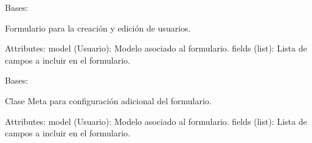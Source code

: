 \documentclass[letterpaper,10pt,spanish]{sphinxmanual}
\begin{document}
\begin{fulllineitems}
\label{\detokenize{modules/appusuarios:appusuarios.forms.UsuarioForm}}
\pysigstartsignatures
{}
\pysigstopsignatures
\sphinxAtStartPar
Bases: 

\sphinxAtStartPar
Formulario para la creación y edición de usuarios.

\sphinxAtStartPar
Attributes:
\sphinxhyphen{} model (Usuario): Modelo asociado al formulario.
\sphinxhyphen{} fields (list): Lista de campos a incluir en el formulario.

\begin{fulllineitems}
\label{\detokenize{modules/appusuarios:appusuarios.forms.UsuarioForm.Meta}}
\pysigstartsignatures
{}
\pysigstopsignatures
\sphinxAtStartPar
Bases: 

\sphinxAtStartPar
Clase Meta para configuración adicional del formulario.

\sphinxAtStartPar
Attributes:
\sphinxhyphen{} model (Usuario): Modelo asociado al formulario.
\sphinxhyphen{} fields (list): Lista de campos a incluir en el formulario.

\begin{fulllineitems}
\label{\detokenize{modules/appusuarios:appusuarios.forms.UsuarioForm.Meta.fields}}
\pysigstartsignatures
{}
\pysigstopsignatures
\end{fulllineitems}


\end{fulllineitems}
\end{fulllineitems}
\end{document}
